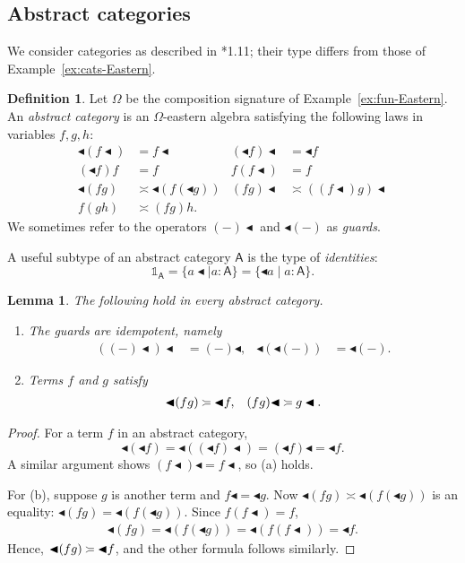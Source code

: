 \documentclass{amsart}
\newcommand{\tin}{:}
\newcommand{\acat}[1]{\mathsf{#1}}
\numberwithin{lstfloat}{section}
\newcommand{\srcfunc}{\mathbin{\blacktriangleleft}}
\newcommand{\tgtfunc}{\mathbin{\blacktriangleleft}}
\newcommand{\src}[1]{#1\srcfunc}
\newcommand{\tgt}[1]{\tgtfunc #1}
\newcommand{\one}{\mathbb{1}}
\newcommand{\venturi}{%
  \mathrel{
    \begin{tikzpicture}[yscale=0.6,xscale=0.5]
        \draw (0ex,2.5ex) to (1ex,2ex);
        \draw (1ex,2ex) to (3ex,2ex);
        \draw (0ex,0.75ex) to (1ex,1.25ex);
        \draw (1ex,1.25ex) to (3ex,1.25ex);
    \end{tikzpicture}
  }
}
\newenvironment{ithm}{\begin{enumerate}[label={\rm(\alph*)}, ref=(\alph*),
      labelwidth=18pt, leftmargin=18pt, topsep=3pt, itemsep=1pt, parsep=2pt]}
      {\end{enumerate}}
\newtheorem{lem}[thm]{Lemma}
\theoremstyle{definition}
\newtheorem{defn}[thm]{Definition}
\theoremstyle{remark}
\numberwithin{equation}{section}
\begin{document}
\subsection{Abstract categories}
\label{sec:abs-cats}

We consider categories as described in \cite{FS}*{1.11}; their type 
differs from those of Example~\ref{ex:cats-Eastern}.

\begin{defn}
  \label{def:abs-cat}
    Let $\Omega$ be the composition signature of Example~\ref{ex:fun-Eastern}. An
    \emph{abstract category} is an $\Omega$-eastern algebra satisfying the
    following laws in variables $f,g,h$:
    \begin{align*}
      \tgt{(\src{f})} & = \src{f} 
      & 
      \src{(\tgt{f})} & = \tgt{f}\\[1ex]
      (\tgt{f}) f & = f
      & 
      f (\src{f})  & = f\\[1ex]
      \tgt{(fg)} & \asymp \tgt{(f (\tgt{g}))}
      & 
      \src{(fg)} & \asymp \src{((\src{f})g)}\\[1ex]
      f(gh)  &\asymp (fg)h.
    \end{align*}
    We sometimes refer to the operators $\src{(-)}$ and
    $\tgt{(-)}$ as \emph{guards}.
  \end{defn}
  A useful subtype of an abstract category $\acat{A}$ is  the type of \emph{identities}:
  \[
    \one_{\acat{A}}=\{\src{a}\mid a\tin\acat{A}\}=\{\tgt{a}\mid a\tin \acat{A}\}. 
  \]
\begin{lem}\label{lem:idempotent-guards} 
  The following hold in every abstract category. 
  \begin{ithm}
    \item\label{lempart:idem} The guards are idempotent, namely
    \begin{align*}
      \src{(\src{(-)})} &= \src{(-)}, & \tgt{(\tgt{(-)})} &= \tgt{(-)}.
    \end{align*}
    \item\label{lempart:guard-reduc} Terms $f$ and $g$ satisfy
    \begin{align*}
      \tgt{(fg)} &\venturi \tgt{f}, & \src{(fg)} \venturi \src{g}.
    \end{align*}
  \end{ithm}
\end{lem}

\begin{proof}
  For a term $f$ in an abstract category,
  \[ 
    \tgt{(\tgt{f})}=\tgt{(\src{(\tgt{f})})}=\src{(\tgt{f})}=\tgt{f}.
  \] 
  A similar argument shows $\src{(\src{f})} =\src{f}$, so (a) holds.

  For (b), suppose $g$ is another term and $\src{f}=\tgt{g}$. Now 
  $\tgt{(fg)} \asymp \tgt{(f(\tgt{g}))}$ is an equality: $\tgt{(fg)} =
  \tgt{(f(\tgt{g}))}$. Since $f(\src{f}) = f$, 
  \begin{align*}
    \tgt{(fg)} = \tgt{(f(\tgt{g}))} = \tgt{(f(\src{f}))} = \tgt{f}.
  \end{align*}
  Hence, $\tgt{(fg)} \venturi \tgt{f}$, and the other formula follows similarly.
\end{proof}
\end{document}
